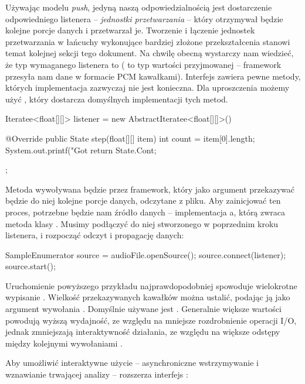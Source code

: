 Używając modelu \emph{push}, jedyną naszą odpowiedzialnością jest dostarczenie odpowiedniego
listenera -- \emph{jednostki przetwarzania} -- który otrzymywał będzie kolejne porcje danych i
przetwarzał je.  Tworzenie i łączenie jednostek przetwarzania w łańcuchy wykonujące bardziej złożone
przekształcenia stanowi temat kolejnej sekcji tego dokument. Na chwilę obecną wystarczy nam
wiedzieć, że typ wymaganego listenera to  ( to typ
wartości przyjmowanej -- framework przesyła nam dane w formacie PCM kawałkami). Interfejs
 zawiera pewne metody, których implementacja zazwyczaj nie jest konieczna. Dla
uproszczenia możemy użyć , który dostarcza domyślnych implementacji tych
metod.

\begin{java}
Iteratee<float[][]> listener = new AbstractIteratee<float[][]>() {

    @Override
    public State step(float[][] item) {
        int count = item[0].length;
        System.out.printf("Got %
        return State.Cont;
    }
};
\end{java}

Metoda  wywoływana będzie przez framework, który jako argument przekazywać będzie do niej
kolejne porcje danych, odczytane z pliku. Aby zainicjować ten proces, potrzebne będzie nam źródło
danych -- implementacja a, którą zwraca metoda  klasy
.  Musimy podłączyć do niej stworzonego w poprzednim kroku listenera, i rozpocząć
odczyt i propagację danych:

\begin{java}
SampleEnumerator source = audioFile.openSource();
source.connect(listener);
source.start();
\end{java}

Uruchomienie powyższego przykładu najprawdopodobniej spowoduje wielokrotne wypisanie . Wielkość przekazywanych kawałków można ustalić, podając ją jako argument wywołania
. Domyślnie używane jest . Generalnie większe
wartości powodują wyższą wydajność, ze względu na mniejsze rozdrobnienie operacji I/O, jednak
zmniejszają interaktywność działania, ze względu na większe odstępy między kolejnymi wywołaniami
.

Aby umożliwić interaktywne użycie -- asynchroniczne wstrzymywanie i wznawianie trwającej analizy --
 rozszerza interfejs :

